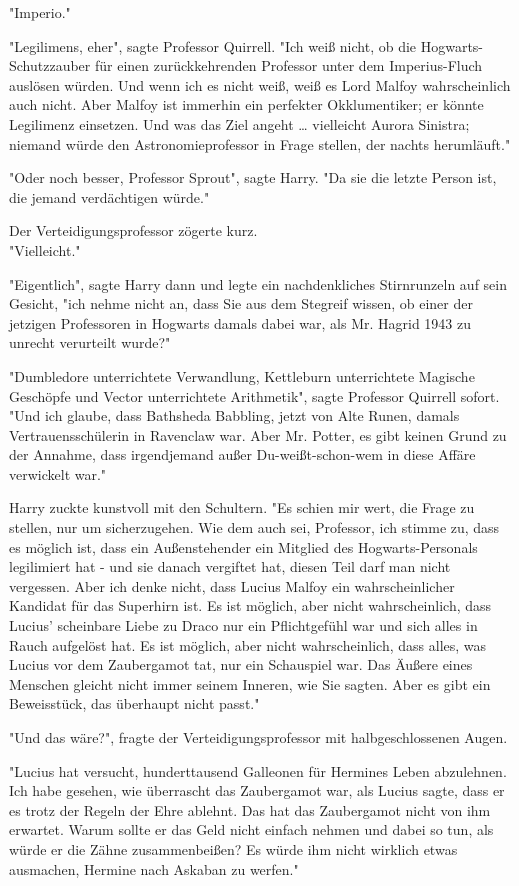 {"Imperio."

"Legilimens, eher", sagte Professor Quirrell. "Ich weiß nicht, ob die Hogwarts-Schutzzauber für einen zurückkehrenden Professor unter dem Imperius-Fluch auslösen würden. Und wenn ich es nicht weiß, weiß es Lord Malfoy wahrscheinlich auch nicht. Aber Malfoy ist immerhin ein perfekter Okklumentiker; er könnte Legilimenz einsetzen. Und was das Ziel angeht … vielleicht Aurora Sinistra; niemand würde den Astronomieprofessor in Frage stellen, der nachts herumläuft."

"Oder noch besser, Professor Sprout", sagte Harry. "Da sie die letzte Person ist, die jemand verdächtigen würde."

Der Verteidigungsprofessor zögerte kurz.\\ "Vielleicht."

"Eigentlich", sagte Harry dann und legte ein nachdenkliches Stirnrunzeln auf sein Gesicht, "ich nehme nicht an, dass Sie aus dem Stegreif wissen, ob einer der jetzigen Professoren in Hogwarts damals dabei war, als Mr. Hagrid 1943 zu unrecht verurteilt wurde?"

"Dumbledore unterrichtete Verwandlung, Kettleburn unterrichtete Magische Geschöpfe und Vector unterrichtete Arithmetik", sagte Professor Quirrell sofort. "Und ich glaube, dass Bathsheda Babbling, jetzt von Alte Runen, damals Vertrauensschülerin in Ravenclaw war. Aber Mr. Potter, es gibt keinen Grund zu der Annahme, dass irgendjemand außer Du-weißt-schon-wem in diese Affäre verwickelt war."

Harry zuckte kunstvoll mit den Schultern. "Es schien mir wert, die Frage zu stellen, nur um sicherzugehen. Wie dem auch sei, Professor, ich stimme zu, dass es möglich ist, dass ein Außenstehender ein Mitglied des Hogwarts-Personals legilimiert hat - und sie danach vergiftet hat, diesen Teil darf man nicht vergessen. Aber ich denke nicht, dass Lucius Malfoy ein wahrscheinlicher Kandidat für das Superhirn ist. Es ist möglich, aber nicht wahrscheinlich, dass Lucius' scheinbare Liebe zu Draco nur ein Pflichtgefühl war und sich alles in Rauch aufgelöst hat. Es ist möglich, aber nicht wahrscheinlich, dass alles, was Lucius vor dem Zaubergamot tat, nur ein Schauspiel war. Das Äußere eines Menschen gleicht nicht immer seinem Inneren, wie Sie sagten. Aber es gibt ein Beweisstück, das überhaupt nicht passt."

"Und das wäre?", fragte der Verteidigungsprofessor mit halbgeschlossenen Augen.

"Lucius hat versucht, hunderttausend Galleonen für Hermines Leben abzulehnen. Ich habe gesehen, wie überrascht das Zaubergamot war, als Lucius sagte, dass er es trotz der Regeln der Ehre ablehnt. Das hat das Zaubergamot nicht von ihm erwartet. Warum sollte er das Geld nicht einfach nehmen und dabei so tun, als würde er die Zähne zusammenbeißen? Es würde ihm nicht wirklich etwas ausmachen, Hermine nach Askaban zu werfen."

}
